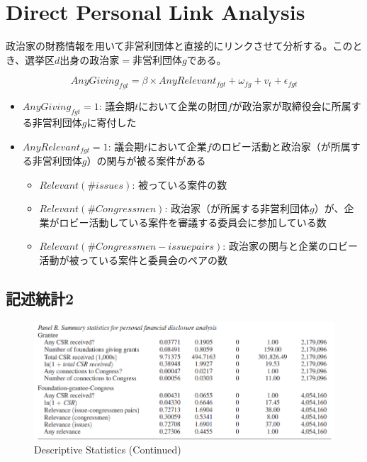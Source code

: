\documentclass[../root]{subfiles}
\begin{document}
    \section{Direct Personal Link Analysis}\label{direct-personal-link-analysis}

    政治家の財務情報を用いて非営利団体と直接的にリンクさせて分析する。このとき、選挙区\(d\)出身の政治家\(=\)非営利団体\(g\)である。

    \begin{equation}
    AnyGiving_{fgt} = \beta \times AnyRelevant_{fgt} + \omega_{fg} + v_t + \epsilon_{fgt}
    \end{equation}

    \begin{itemize}
    
    \item
      \(AnyGiving_{fgt} = 1\): 議会期\(t\)において企業の財団\(f\)が政治家が取締役会に所属する非営利団体\(g\)に寄付した
    \item
      \(AnyRelevant_{fgt} = 1\): 議会期\(t\)において企業\(f\)のロビー活動と政治家（が所属する非営利団体\(g\)）の関与が被る案件がある

      \begin{itemize}
      
      \item
        \(Relevant(\#issues)\): 被っている案件の数
      \item
        \(Relevant(\#Congressmen)\): 政治家（が所属する非営利団体\(g\)）が、企業がロビー活動している案件を審議する委員会に参加している数
      \item
        \(Relevant(\#Congressmen-issue pairs)\): 政治家の関与と企業のロビー活動が被っている案件と委員会のペアの数
      \end{itemize}
    \end{itemize}

    \subsection{記述統計2}\label{ux8a18ux8ff0ux7d71ux8a082}

    \begin{figure}
    \centering
    \includegraphics[width = .8\linewidth]{0911kato/92614392-f389ea80-f2f6-11ea-8b28-0cfd40735f4a.png}
    \caption{Descriptive Statistics (Continued)}
    \end{figure}
\end{document}
